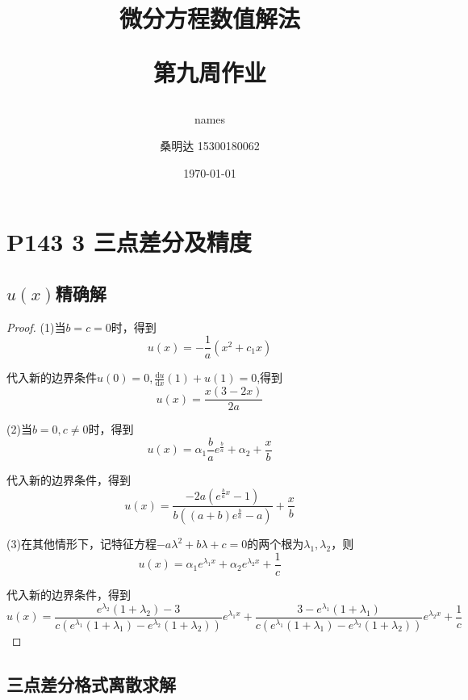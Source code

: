 \documentclass{article}%
\author{names}
\title{\heiti 微分方程数值解法\\ [2ex] \begin{large} 第九周作业 \end{large}}
\author{\kaishu 桑明达 15300180062}
\date{\today}
\begin{document}
\maketitle


\section{P143 3 三点差分及精度}

\subsection{$u(x)$精确解}
\begin{proof}
	(1)当$b=c=0$时，得到$$ u\left ( x \right )=-\frac{1}{a}\left ( x^{2}+c_1x \right ) $$

	代入新的边界条件$ u\left ( 0 \right )=0,\frac{\mathrm{d}u}{\mathrm{d}x}\left ( 1 \right )+u\left ( 1 \right )=0 $,得到$$ u\left ( x \right )=\frac{x\left ( 3-2x \right )}{2a} $$

	(2)当$b=0,c\neq 0$时，得到$$ u\left ( x \right )=\alpha _1\frac{b}{a}e^{\frac{b}{a}}+\alpha _2+\frac{x}{b} $$

	代入新的边界条件，得到$$ u\left ( x \right )=\frac{-2a\left ( e^{\frac{b}{a}x}-1 \right )}{b\left (\left ( a+b \right )e^{\frac{b}{a}}-a  \right )}+\frac{x}{b} $$

	(3)在其他情形下，记特征方程$ -a\lambda ^2+b\lambda+c=0 $的两个根为$ \lambda_1,\lambda_2 $，则$$ u\left ( x \right )=\alpha_1e^{\lambda_1x}+\alpha_2e^{\lambda_2x}+\frac{1}{c} $$

	代入新的边界条件，得到$$ u\left ( x \right )=\frac{e^{\lambda_2}\left ( 1+\lambda_2 \right )-3}{c\left ( e^{\lambda_1}\left ( 1+\lambda_1 \right )-e^{\lambda_2}\left ( 1+\lambda_2 \right ) \right )}e^{\lambda_1x}+\frac{3-e^{\lambda_1}\left ( 1+\lambda_1 \right )}{c\left ( e^{\lambda_1}\left ( 1+\lambda_1 \right )-e^{\lambda_2}\left ( 1+\lambda_2 \right ) \right )}e^{\lambda_2x}+\frac{1}{c} $$

\end{proof}

\subsection{三点差分格式离散求解}
\end{document}
